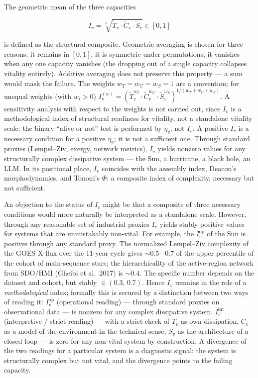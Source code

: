 \documentclass[pdflatex,sn-mathphys-ay]{sn-jnl}
\begin{document}
The geometric mean of the three capacities

\begin{equation}I_v = \sqrt[3]{\tilde{T}_v \cdot \tilde{C}_v \cdot \tilde{S}_v} \in [0, 1] \tag{2b}\end{equation}

is defined as the structural composite. Geometric averaging is chosen for three reasons: it remains in \([0, 1]\); it is symmetric under permutations; it vanishes when any one capacity vanishes (the dropping out of a single capacity collapses vitality entirely). Additive averaging does not preserve this property --- a sum would mask the failure. The weights \(w_T = w_C = w_S = 1\) are a convention; for unequal weights (with \(w_i > 0\)) \(I_v^{(w)} = (\tilde{T}_v^{w_T} \cdot \tilde{C}_v^{w_C} \cdot \tilde{S}_v^{w_S})^{1/(w_T + w_C + w_S)}\). A sensitivity analysis with respect to the weights is not carried out, since \(I_v\) is a methodological index of structural readiness for vitality, not a standalone vitality scale: the binary ``alive or not'' test is performed by \(\eta_v\), not \(I_v\). A positive \(I_v\) is a necessary condition for a positive \(\eta_v\); it is not a sufficient one. Through standard proxies (Lempel--Ziv, exergy, network metrics), \(I_v\) yields nonzero values for any structurally complex dissipative system --- the Sun, a hurricane, a black hole, an LLM. In its positional place, \(I_v\) coincides with the assembly index, Deacon's morphodynamics, and Tononi's \(\Phi\): a composite index of complexity, necessary but not sufficient.

An objection to the status of \(I_v\) might be that a composite of three necessary conditions would more naturally be interpreted as a standalone scale. However, through any reasonable set of industrial proxies \(I_v\) yields stably positive values for systems that are unmistakably non-vital. For example, the \(I_v^{\text{op}}\) of the Sun is positive through any standard proxy. The normalized Lempel--Ziv complexity of the GOES X-flux over the 11-year cycle gives \(\sim 0.5\)-- \(0.7\) of the upper percentile of the cohort of main-sequence stars; the hierarchicality of the active-region network from SDO/HMI (Gheibi et al.~2017) is \(\sim 0.4\). The specific number depends on the dataset and cohort, but stably \(\in (0.3,\, 0.7)\). Hence \(I_v\) remains in the role of a \emph{methodological} index; formally this is secured by a distinction between two ways of reading it: \(I_v^{\text{op}}\) (operational reading) --- through standard proxies on observational data --- is nonzero for any complex dissipative system. \(I_v^{\text{int}}\) (interpretive / strict reading) --- with a strict check of \(T_v\) as own dissipation, \(C_v\) as a model of the environment in the technical sense, \(S_v\) as the architecture of a closed loop --- is zero for any non-vital system by construction. A divergence of the two readings for a particular system is a diagnostic signal: the system is structurally complex but not vital, and the divergence points to the failing capacity.
\end{document}
